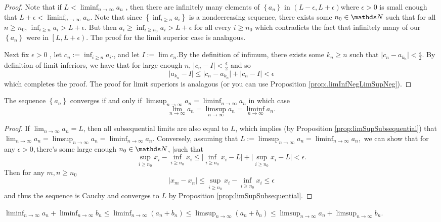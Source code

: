 \begin{proof}
Note that if $L<\liminf_{n\to\infty}a_{n}$ , then there are infinitely
many elements of $\left\{ a_{n}\right\} $ in $\left(L-\epsilon,L+\epsilon\right)$where
$\epsilon>0$ is small enough that $L+\epsilon<\liminf_{n\to\infty}a_{n}$.
Note that since $\left\{ \inf_{i\geq n}a_{i}\right\} $ is a nondecreasing
sequence, there exists some $n_{0}\in\N$ such that for all $n\geq n_{0}$,
$\inf_{i\geq n}a_{i}>L+\epsilon$. But then $a_{i}\geq\inf_{i\geq n_{0}}a_{i}>L+\epsilon$
for all every $i\geq n_{0}$ which contradicts the fact that infinitely
many of our $\left\{ a_{n}\right\} $ were in $\left[L,L+\epsilon\right)$.
The proof for the limit superior case is analagous.

Next fix $\epsilon>0$ , let $c_{n}:=\inf_{i\geq n}a_{i}$., and let
$I:=\lim c_{n}.$By the definition of infimum, there exists some $k_{n}\geq n$
such that $\lvert c_{n}-a_{k_{n}}\rvert<\frac{\epsilon}{2}$. By definition
of limit inferiors, we have that for large enough $n$, $\lvert c_{n}-I\rvert<\frac{\epsilon}{2}$
and so
\[
\lvert a_{k_{n}}-I\rvert\leq\lvert c_{n}-a_{k_{n}}\rvert+\lvert c_{n}-I\rvert<\epsilon
\]
which completes the proof. The proof for limit superiors is analagous
(or you can use Proposition \ref{prop:.limInfNegLimSupNeg}).
\end{proof}
\begin{prop}
\label{prop:limSupEqualLimInf}The sequence $\left\{ a_{n}\right\} $
converges if and only if $\limsup_{n\to\infty}a_{n}=\liminf_{n\to\infty}a_{n}$
in which case 
\[
\lim_{n\to\infty}a_{n}=\limsup_{n\to\infty}a_{n}=\liminf_{n\to\infty}a_{n}.
\]
\end{prop}

\begin{proof}
If $\lim_{n\to\infty}a_{n}=L$, then all subsequential limits are
also equal to $L$, which implies (by Proposition \ref{prop:limSupSubsequential})
that $\lim_{n\to\infty}a_{n}=\limsup_{n\to\infty}a_{n}=\liminf_{n\to\infty}a_{n}.$
Conversely, assuming that $L:=\limsup_{n\to\infty}a_{n}=\liminf_{n\to\infty}a_{n},$
we can show that for any $\epsilon>0,$there's some large enough $n_{0}\in\N$,
$\lvert$such that
\[
\sup_{i\geq n_{0}}x_{i}-\inf_{i\geq n_{0}}x_{i}\leq\lvert\inf_{i\geq n_{0}}x_{i}-L\rvert+\lvert\sup_{i\geq n_{0}}x_{i}-L\rvert<\epsilon.
\]
Then for any $m,n\geq n_{0}$
\[
\rvert x_{m}-x_{n}\rvert\leq\sup_{i\geq n_{0}}x_{i}-\inf_{i\geq n_{0}}x_{i}\leq\epsilon
\]
and thus the sequence is Cauchy and converges to $L$ by Proposition
\ref{prop:limSupSubsequential}.
\end{proof}
\begin{prop}
\label{prop:SumLimInf}$\liminf_{n\to\infty}a_{n}+\liminf_{n\to\infty}b_{n}\leq\liminf_{n\to\infty}\left(a_{n}+b_{n}\right)\leq\limsup_{n\to\infty}\left(a_{n}+b_{n}\right)\leq\limsup_{n\to\infty}a_{n}+\limsup_{n\to\infty}b_{n}.$
\end{prop}

